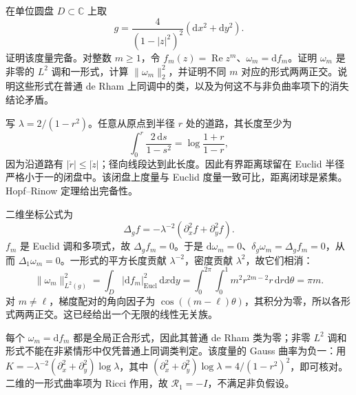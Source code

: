 \begin{exercise}\label{g3:ex:hyperbolic-disk-exact-l2-forms}
	在单位圆盘 \(D\subset\mathbb C\) 上取
	\[
		g=\frac{4}{(1-|z|^2)^2}(\mathrm dx^2+\mathrm dy^2).
	\]
	证明该度量完备。对整数 \(m\ge1\)，令 \(f_m(z)=\operatorname{Re}z^m\)、\(\omega_m=\mathrm df_m\)。证明 \(\omega_m\) 是非零的 \(L^2\) 调和一形式，计算 \(\|\omega_m\|_2^2\)，并证明不同 \(m\) 对应的形式两两正交。说明这些形式在普通 de Rham 上同调中的类，以及为何这不与非负曲率项下的消失结论矛盾。
\end{exercise}
\begin{solution}
	写 \(\lambda=2/(1-r^2)\)。任意从原点到半径 \(r\) 处的道路，其长度至少为
	\[
		\int_0^r\frac{2\,\mathrm ds}{1-s^2}
		=\log\frac{1+r}{1-r},
	\]
	因为沿道路有 \(|\dot r|\le|\dot z|\)；径向线段达到此长度。因此有界距离球留在 Euclid 半径严格小于一的闭盘中。该闭盘上度量与 Euclid 度量一致可比，距离闭球是紧集。Hopf--Rinow 定理给出完备性。

	二维坐标公式为
	\[
		\Delta_g f=-\lambda^{-2}(\partial_x^2f+\partial_y^2f).
	\]
	\(f_m\) 是 Euclid 调和多项式，故 \(\Delta_gf_m=0\)。于是
	\(\mathrm d\omega_m=0\)、\(\delta_g\omega_m=\Delta_gf_m=0\)，从而 \(\Delta_1\omega_m=0\)。一形式的平方长度贡献 \(\lambda^{-2}\)，密度贡献 \(\lambda^2\)，故它们相消：
	\[
		\|\omega_m\|_{L^2(g)}^2
		=\int_D|\mathrm df_m|_{\mathrm{Eucl}}^2\,\mathrm dx\mathrm dy
		=\int_0^{2\pi}\!\int_0^1m^2r^{2m-2}r\,\mathrm dr\mathrm d\theta
		=\pi m.
	\]
	对 \(m\ne\ell\)，梯度配对的角向因子为 \(\cos((m-\ell)\theta)\)，其积分为零，所以各形式两两正交。这已经给出一个无限的线性无关族。

	每个 \(\omega_m=\mathrm df_m\) 都是全局正合形式，因此其普通 de Rham 类为零；非零 \(L^2\) 调和形式不能在非紧情形中仅凭普通上同调类判定。该度量的 Gauss 曲率为负一：用 \(K=-\lambda^{-2}(\partial_x^2+\partial_y^2)\log\lambda\)，其中 \((\partial_x^2+\partial_y^2)\log\lambda=4/(1-r^2)^2\)，即可核对。二维的一形式曲率项为 Ricci 作用，故 \(\mathcal R_1=-I\)，不满足非负假设。
\end{solution}


